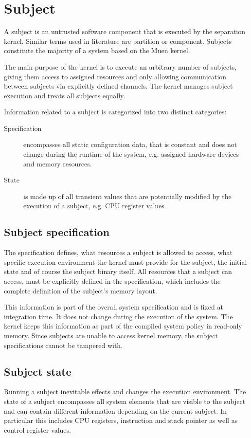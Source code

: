 \section{Subject}\label{sec:subject}
A subject is an untrusted software component that is executed by the separation
kernel. Similar terms used in literature are partition or component. Subjects
constitute the majority of a system based on the Muen kernel.

The main purpose of the kernel is to execute an arbitrary number of subjects,
giving them access to assigned resources and only allowing communication between
subjects via explicitly defined channels. The kernel manages subject execution
and treats all subjects equally.

Information related to a subject is categorized into two distinct categories:

\begin{description}
	\item[Specification] encompasses all static configuration data, that is
		constant and does not change during the runtime of the system, e.g.
		assigned hardware devices and memory resources.
	\item[State] is made up of all transient values that are potentially
		modified by the execution of a subject, e.g. CPU register values.
\end{description}

\subsection{Subject specification}
The specification defines, what resources a subject is allowed to access, what
specific execution environment the kernel must provide for the subject, the
initial state and of course the subject binary itself. All resources that a
subject can access, must be explicitly defined in the specification, which
includes the complete definition of the subject's memory layout.

This information is part of the overall system specification and is fixed at
integration time. It does not change during the execution of the system. The
kernel keeps this information as part of the compiled system policy in read-only
memory. Since subjects are unable to access kernel memory, the subject
specifications cannot be tampered with.

\subsection{Subject state}
Running a subject inevitable effects and changes the execution environment. The
state of a subject encompasses all system elements that are visible to the
subject and can contain different information depending on the current subject.
In particular this includes CPU registers, instruction and stack pointer as well
as control register values.

